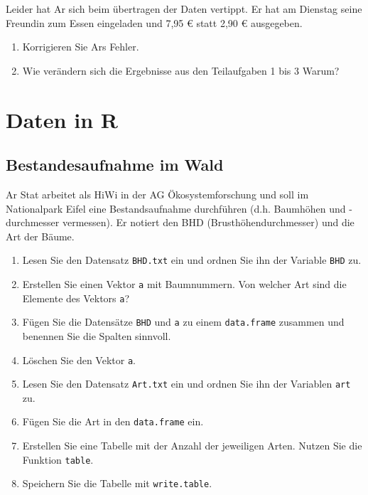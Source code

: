 \documentclass[]{book}
\providecommand{\tightlist}{%
  \setlength{\itemsep}{0pt}\setlength{\parskip}{0pt}}
\begin{document}
Leider hat Ar sich beim übertragen der Daten vertippt. Er hat am Dienstag seine Freundin zum Essen eingeladen und 7,95 € statt 2,90 € ausgegeben.

\begin{enumerate}
\def\labelenumi{\arabic{enumi}.}
\setcounter{enumi}{3}
\tightlist
\item
  Korrigieren Sie Ars Fehler.
\item
  Wie verändern sich die Ergebnisse aus den Teilaufgaben 1 bis 3 Warum?
\end{enumerate}

\hypertarget{daten-in-r}{%
\section{Daten in R}\label{daten-in-r}}

\hypertarget{bestandesaufnahme}{%
\subsection{Bestandesaufnahme im Wald}\label{bestandesaufnahme}}

Ar Stat arbeitet als HiWi in der AG Ökosystemforschung und soll im Nationalpark Eifel eine Bestandsaufnahme durchführen (d.h. Baumhöhen und -durchmesser vermessen). Er notiert den BHD (Brusthöhendurchmesser) und die Art der Bäume.

\begin{enumerate}
\def\labelenumi{\arabic{enumi}.}
\tightlist
\item
  Lesen Sie den Datensatz \texttt{BHD.txt} ein und ordnen Sie ihn der Variable \texttt{BHD} zu.
\item
  Erstellen Sie einen Vektor \texttt{a} mit Baumnummern. Von welcher Art sind die Elemente des Vektors \texttt{a}?
\item
  Fügen Sie die Datensätze \texttt{BHD} und \texttt{a} zu einem \texttt{data.frame} zusammen und benennen Sie die Spalten sinnvoll.
\item
  Löschen Sie den Vektor \texttt{a}.
\item
  Lesen Sie den Datensatz \texttt{Art.txt} ein und ordnen Sie ihn der Variablen \texttt{art} zu.
\item
  Fügen Sie die Art in den \texttt{data.frame} ein.
\item
  Erstellen Sie eine Tabelle mit der Anzahl der jeweiligen Arten. Nutzen Sie die Funktion \texttt{table}.
\item
  Speichern Sie die Tabelle mit \texttt{write.table}.
\end{enumerate}
\end{document}
